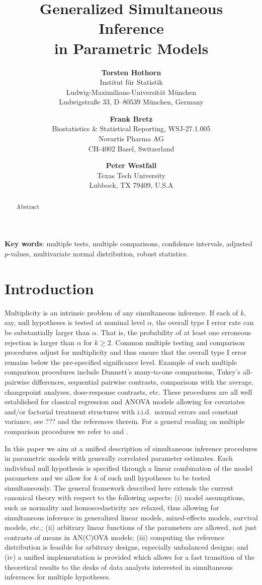 \documentclass[12pt]{article}
\title{Generalized Simultaneous Inference \\ in Parametric Models}
\author{\textbf{Torsten Hothorn} \\
Institut f{\"u}r Statistik \\
Ludwig-Maximilians-Universit{\"a}t M{\"u}nchen \\
Ludwigstra{\ss}e 33, D--80539 M{\"u}nchen, Germany\\
\and \textbf{Frank Bretz} \\
Biostatistics \& Statistical Reporting, WSJ-27.1.005\\
Novartis Pharma AG \\
CH-4002 Basel, Switzerland \\
\and \textbf{Peter Westfall} \\
Texas Tech University \\
Lubbock, TX 79409, U.S.A}
\begin{document}
\maketitle
\thispagestyle{empty}
\setcounter{page}{0}

\begin{abstract}
Abstract
\end{abstract}

\textbf{Key words}: multiple tests, multiple comparisons, confidence intervals,
adjusted $p$-values, multivariate normal distribution, robust statistics.

\newpage

\section{Introduction}

Multiplicity is an intrinsic problem of any simultaneous inference. 
If each of $k$, say, null hypotheses is tested at nominal level $\alpha$, 
the overall type I error rate can be substantially larger than $\alpha$.
That is, the probability of at least one erroneous rejection is larger than $\alpha$ for 
$k \geq 2$. Common multiple testing and comparison procedures adjust for multiplicity and thus 
ensure that the overall type I error remains below the pre-specified significance level.
Example of such multiple comparison procedures include Dunnett's many-to-one comparisons,
Tukey's all-pairwise differences, sequential pairwise contrasts, comparisons with the 
average, changepoint analyses, dose-response contrasts, etc. These procedures are
all well established for classical regression and ANOVA models allowing for covariates 
and/or factorial treatment structures with i.i.d.~normal errors and constant 
variance, see ??? and the references therein. For a general reading 
on multiple comparison procedures we refer to 
\cite{HochbergTamhane1987} and \cite{Hsu1996}.

In this paper we aim at a unified description of simultaneous
inference procedures in parametric models with generally correlated parameter estimates.
Each individual null hypothesis is specified through a linear
combination of the model parameters and we allow
for $k$ of such null hypotheses to be tested simultaneously.
The general framework described here extends the current canonical theory 
with respect to the following aspects: (i) model assumptions, such as normality 
and homoscedasticity
are relaxed, thus allowing for simultaneous inference
in generalized linear models, mixed-effects models,
survival models, etc.; (ii) arbitrary linear functions of the
parameters are allowed, not just contrasts of means in AN(C)OVA models; (iii)
computing the reference distribution is feasible for arbitrary designs,
especially unbalanced designs; and (iv)
a unified implementation is provided which allows for a fast transition of the
theoretical results to the desks of data analysts interested
in simultaneous inferences for multiple hypotheses.
\end{document}
